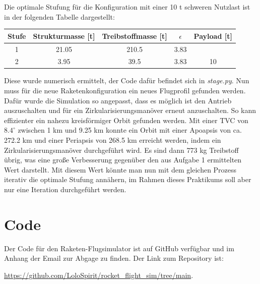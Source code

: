 \documentclass[12pt]{article}
\begin{document}
\begin{enumerate}
    Die optimale Stufung für die Konfiguration mit einer 10 t schweren Nutzlast ist in der folgenden Tabelle dargestellt:
    \begin{center}
        \begin{tabular}{c | c | c | c | c}
            Stufe & Strukturmasse [t] & Treibstoffmasse [t] & $\epsilon$ & Payload [t] \\
            \midrule
            1 & 21.05 & 210.5 & 3.83 &  \\
            2 & 3.95 & 39.5 & 3.83 & 10 \\
        \end{tabular}
    \end{center}
    Diese wurde numerisch ermittelt, der Code dafür befindet sich in \textit{stage.py}. Nun muss für die neue Raketenkonfiguration ein neues Flugprofil gefunden werden. Dafür wurde die Simulation so angepasst, dass es möglich ist den Antrieb auszuschalten und für ein Zirkularisierungsmanöver erneut anzuschalten. So kann effizienter ein nahezu kreisförmiger Orbit gefunden werden. Mit einer TVC von $8.4 ^\circ$ zwischen 1 km und 9.25 km konnte ein Orbit mit einer Apoapsis von ca. 272.2 km und einer Periapsis von 268.5 km erreicht werden, indem ein Zirkularisierungsmanöver durchgeführt wird. Es sind dann 773 kg Treibstoff übrig, was eine große Verbesserung gegenüber den aus Aufgabe 1 ermittelten Wert darstellt. Mit diesem Wert könnte man nun mit dem gleichen Prozess iterativ die optimale Stufung annähern, im Rahmen dieses Praktikums soll aber nur eine Iteration durchgeführt werden.
    


\end{enumerate}

\appendix
\section{Code}
Der Code für den Raketen-Flugsimulator ist auf GitHub verfügbar und im Anhang der Email zur Abgage zu finden. Der Link zum Repository ist:

\url{https://github.com/LoloSpirit/rocket_flight_sim/tree/main}.
\end{document}
